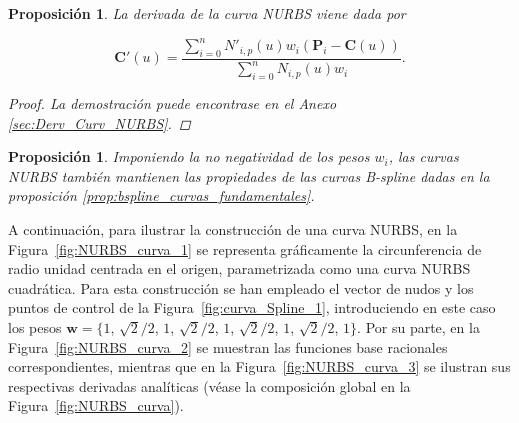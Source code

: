 \documentclass[11pt]{book}
\theoremstyle{plain} %
\newtheorem{proposicion}[teorema]{Proposición}
\theoremstyle{definition} %
\theoremstyle{definition} %
\begin{document}
\vspace{-0.2cm}

\begin{proposicion}
    La derivada de la curva NURBS viene dada por

    \vspace{-0.15cm}

    $$\mathbf{C}'(u) = \frac{\sum_{i=0}^{n} N'_{i,p}(u) w_i \left( \mathbf{P}_i - \mathbf{C}(u) \right)}{\sum_{i=0}^{n} N_{i,p}(u) w_i}.$$
    
    \vspace{-0.35cm}

    \begin{proof}
        La demostración puede encontrase en el Anexo \ref{sec:Derv_Curv_NURBS}.
    \end{proof}
\end{proposicion}

\vspace{-0.25cm}

\begin{proposicion}
    Imponiendo la no negatividad de los pesos $w_i$, las curvas NURBS también mantienen las propiedades de las curvas B-spline dadas en la proposición \ref{prop:bspline_curvas_fundamentales}.
\end{proposicion}

\vspace{-0.1cm}


A continuación, para ilustrar la construcción de una curva NURBS, en la Figura~\ref{fig:NURBS_curva_1} se representa gráficamente la circunferencia de radio unidad centrada en el origen, parametrizada como una curva NURBS cuadrática. Para esta construcción se han empleado el vector de nudos y los puntos de control de la Figura~\ref{fig:curva_Spline_1}, introduciendo en este caso los pesos $\mathbf{w} = \{ 1$, $\sqrt{2}/2$, $1$, $\sqrt{2}/2$, $1$, $\sqrt{2}/2$, $1$, $\sqrt{2}/2$, $1 \}$. Por su parte, en la Figura~\ref{fig:NURBS_curva_2} se muestran las funciones base racionales correspondientes, mientras que en la Figura~\ref{fig:NURBS_curva_3} se ilustran sus respectivas derivadas analíticas (véase la composición global en la Figura~\ref{fig:NURBS_curva}).
\end{document}
